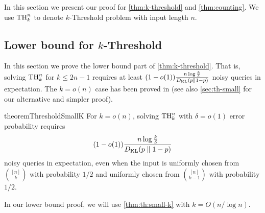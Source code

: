In this section we present our proof for \cref{thm:k-threshold} and \cref{thm:counting}.
We use $\Threshold{n}{k}$ to denote $k$-Threshold problem with input length $n$.

\subsection{Lower bound for \texorpdfstring{$k$}{k}-Threshold}
In this section we prove the lower bound part of \cref{thm:k-threshold}. That is, solving $\Threshold{n}{k}$ for $k\le 2n-1$ requires at least $(1-o(1)) \frac{n \log \frac k\delta}{\DKL}$ noisy queries in expectation.
The $k=o(n)$ case has been proved in \cite{wang2024noisy} (see also \cref{sec:th-small} for our alternative and simpler proof).


\begin{restatable}{theorem}{ThresholdSmallK}\label{thm:th:small-k}
For $k = o(n)$, solving $\Threshold{n}{k}$ with $
\delta = o(1)$ error probability requires
\[
(1-o(1))\frac{n \log \frac{k}{\delta}}{\DKL}
\]
noisy queries in expectation,
even when the input is uniformly chosen from $\binom{[n]}{k}$ with probability $1/2$ and uniformly chosen from $\binom{[n]}{k-1}$ with probability $1/2$. %
\end{restatable}
In our lower bound proof, we will use \cref{thm:th:small-k} with $k=O(n/\log n)$.

